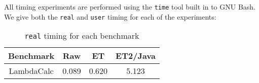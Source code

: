 All timing experiments are performed using the \lstinline{time} tool built in to GNU Bash. We give both the \lstinline{real} and \lstinline{user} timing for
each of the experiments:

\begin{table}[h!]
  \centering
  \begin{tabular}{| c | c | c | c |}
    \hline
    Benchmark & Raw & ET& ET2/Java\\
    \hline \hline
    LambdaCalc & 0.089  & 0.620 & 5.123\\
    \hline
    
  \end{tabular}
  \caption{\lstinline{real} timing for each benchmark}
\end{table}
